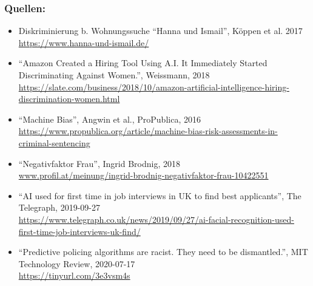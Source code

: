 \documentclass[aspectratio=43,usenames,dvipsnames]{beamer}
\begin{document}
\begin{frame}
\frametitle{Quellen:}
\scriptsize
\begin{itemize}
\item Diskriminierung b. Wohnungssuche ``Hanna und Ismail'', Köppen et al.  2017\\
\url{https://www.hanna-und-ismail.de/}

\item ``Amazon Created a Hiring Tool Using A.I. It Immediately Started Discriminating Against Women.'', Weissmann, 2018\\ \url{https://slate.com/business/2018/10/amazon-artificial-intelligence-hiring-discrimination-women.html}

\item ``Machine Bias'', Angwin et al., ProPublica, 2016\\ \url{https://www.propublica.org/article/machine-bias-risk-assessments-in-criminal-sentencing}

\item ``Negativfaktor Frau'', Ingrid Brodnig, 2018 \\ \url{www.profil.at/meinung/ingrid-brodnig-negativfaktor-frau-10422551}

\item ``AI used for first time in job interviews in UK to find best applicants'', The Telegraph, 2019-09-27 \\ \url{https://www.telegraph.co.uk/news/2019/09/27/ai-facial-recognition-used-first-time-job-interviews-uk-find/}

\item ``Predictive policing algorithms are racist. They need to be dismantled.'', MIT Technology Review, 2020-07-17 \\ \url{https://tinyurl.com/3e3vsm4s}

\end{itemize}
\end{frame}
\end{document}
